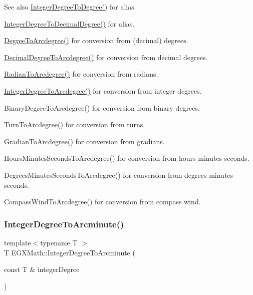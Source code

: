 \begin{DoxySeeAlso}{See also}
\mbox{\hyperlink{group___e_g_x_math-_angle_conversions-_integer_degree_gaa9b63c6095fd7f8809fcfa2ba1e62235}{Integer\+Degree\+To\+Degree()}} for alias. 

\mbox{\hyperlink{group___e_g_x_math-_angle_conversions-_integer_degree_gac219c3198508ba984d8d81d22831b27d}{Integer\+Degree\+To\+Decimal\+Degree()}} for alias. 

\mbox{\hyperlink{group___e_g_x_math-_angle_conversions-_degree_gac1b5f3b68f66c77a6df4ceef842c9b19}{Degree\+To\+Arcdegree()}} for conversion from (decimal) degrees. 

\mbox{\hyperlink{group___e_g_x_math-_angle_conversions-_decimal_degree_gacdd463fcabffeb598ebda65b012ce743}{Decimal\+Degree\+To\+Arcdegree()}} for conversion from decimal degrees. 

\mbox{\hyperlink{group___e_g_x_math-_angle_conversions-_radian_ga3dfdc97357cc07f8379976bbc08f9852}{Radian\+To\+Arcdegree()}} for conversion from radians. 

\mbox{\hyperlink{group___e_g_x_math-_angle_conversions-_integer_degree_gaf633d0b82bfb7586ce86ffbcf78d8f7a}{Integer\+Degree\+To\+Arcdegree()}} for conversion from integer degrees. 

Binary\+Degree\+To\+Arcdegree() for conversion from binary degrees. 

Turn\+To\+Arcdegree() for conversion from turns. 

Gradian\+To\+Arcdegree() for conversion from gradians. 

Hours\+Minutes\+Seconds\+To\+Arcdegree() for conversion from hours minutes seconds. 

Degrees\+Minutes\+Seconds\+To\+Arcdegree() for conversion from degrees minutes seconds. 

Compass\+Wind\+To\+Arcdegree() for conversion from compass wind. 
\end{DoxySeeAlso}
\mbox{\label{group___e_g_x_math-_angle_conversions-_integer_degree_ga78b014e7649d666a3647c467e64e4fe8}} 
\subsubsection{\texorpdfstring{Integer\+Degree\+To\+Arcminute()}{IntegerDegreeToArcminute()}}
{\footnotesize\ttfamily template$<$typename T $>$ \\
T E\+G\+X\+Math\+::\+Integer\+Degree\+To\+Arcminute (\begin{DoxyParamCaption}\item[{const T \&}]{integer\+Degree }\end{DoxyParamCaption})}




